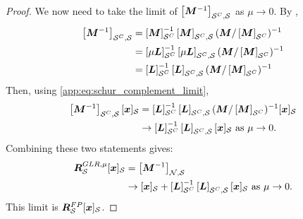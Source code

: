 \begin{proof}
We now need to take the limit of $\msubgen[\set{S}^{C},\set{S}]{\matr{M}^{-1}}$ as $\mu \to 0$. By \cite[(0.7.3.1)]{horn-and-johnson},
\begin{align} 
    \msubgen[\set{S}^{C},\set{S}]{\matr{M}^{-1}} &= \msubgen[\set{S}^{C}]{\matr{M}}^{-1}\msubgen[\set{S}^{C},\set{S}]{\matr{M}} (\matr{M} / \msubgen[\set{S}^{C}]{\matr{M}})^{-1} \\
    &= \msubgen[\set{S}^{C}]{\mu\matr{L}}^{-1}\msubgen[\set{S}^{C},\set{S}]{\mu\matr{L}} (\matr{M} / \msubgen[\set{S}^{C}]{\matr{M}})^{-1} \\
    &= \msubgen[\set{S}^{C}]{\matr{L}}^{-1}\msubgen[\set{S}^{C},\set{S}]{\matr{L}} (\matr{M} / \msubgen[\set{S}^{C}]{\matr{M}})^{-1}
\end{align}
Then, using \eqref{app:eq:schur_complement_limit},
\begin{align}
    \msubgen[\set{S}^{C},\set{S}]{\matr{M}^{-1}}\vectsub[S]{x} &= \msubgen[\set{S}^{C}]{\matr{L}}^{-1}\msubgen[\set{S}^{C},\set{S}]{\matr{L}} (\matr{M} / \msubgen[\set{S}^{C}]{\matr{M}})^{-1}\vectsub[S]{x} \\
    &\to \msubgen[\set{S}^{C}]{\matr{L}}^{-1}\msubgen[\set{S}^{C},\set{S}]{\matr{L}}\vectsub[S]{x} \text{ as }\mu \to 0.
\end{align}
Combining these two statements gives:
\begin{align}
    \matr{R}_{\set{S}}^{GLR, \mu}\vectsub[S]{x} &= \msubgen[\set{N}, \set{S}]{\matr{M}^{-1}}
    \\ &\to \vectsub[S]{x} + \msubgen[\set{S}^{C}]{\matr{L}}^{-1}\msubgen[\set{S}^{C},\set{S}]{\matr{L}}\vectsub[S]{x} \text{ as } \mu \to 0.
\end{align}
This limit is $\matr{R}_{\set{S}}^{FP}\vectsub[S]{x}$.
\end{proof}